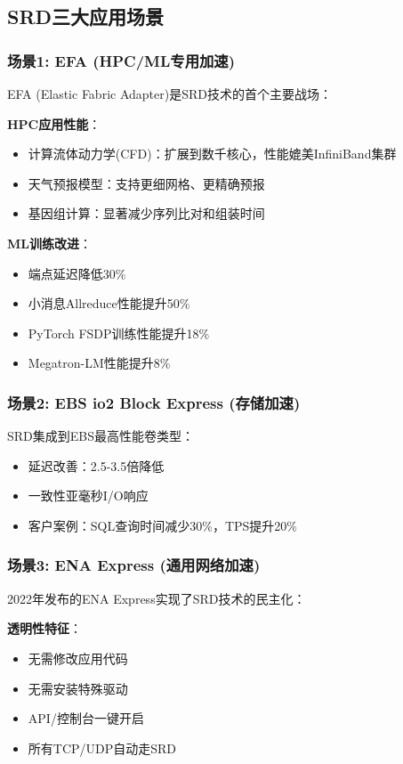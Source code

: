 \subsection{SRD三大应用场景}

\subsubsection{场景1: EFA (HPC/ML专用加速)}

EFA (Elastic Fabric Adapter)是SRD技术的首个主要战场：

\textbf{HPC应用性能}：
\begin{itemize}
    \item 计算流体动力学(CFD)：扩展到数千核心，性能媲美InfiniBand集群
    \item 天气预报模型：支持更细网格、更精确预报
    \item 基因组计算：显著减少序列比对和组装时间
\end{itemize}

\textbf{ML训练改进}：
\begin{itemize}
    \item 端点延迟降低30\%
    \item 小消息Allreduce性能提升50\%
    \item PyTorch FSDP训练性能提升18\%
    \item Megatron-LM性能提升8\%
\end{itemize}

\subsubsection{场景2: EBS io2 Block Express (存储加速)}

SRD集成到EBS最高性能卷类型：
\begin{itemize}
    \item 延迟改善：2.5-3.5倍降低
    \item 一致性亚毫秒I/O响应
    \item 客户案例：SQL查询时间减少30\%，TPS提升20\%
\end{itemize}

\subsubsection{场景3: ENA Express (通用网络加速)}

2022年发布的ENA Express实现了SRD技术的民主化：

\textbf{透明性特征}：
\begin{itemize}
    \item 无需修改应用代码
    \item 无需安装特殊驱动
    \item API/控制台一键开启
    \item 所有TCP/UDP自动走SRD
\end{itemize}

